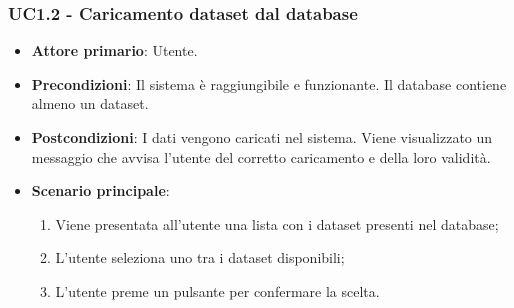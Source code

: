 \subsubsection{UC1.2 - Caricamento dataset dal database}
\begin{itemize}
	\item \textbf{Attore primario}: Utente.
	\item \textbf{Precondizioni}: Il sistema è raggiungibile e funzionante. Il database contiene almeno un dataset.
	\item \textbf{Postcondizioni}: I dati vengono caricati nel sistema. Viene visualizzato un messaggio che avvisa l'utente del corretto caricamento e della loro validità.
	\item \textbf{Scenario principale}: 
	\begin{enumerate}
			\item Viene presentata all'utente una lista con i dataset presenti nel database;
			\item L'utente seleziona uno tra i dataset disponibili;
			\item L'utente preme un pulsante per confermare la scelta.
		\end{enumerate}
	
\end{itemize}